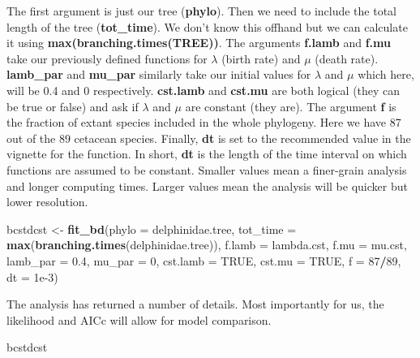 \documentclass[
]{book}
\newenvironment{Shaded}{\begin{snugshade}}{\end{snugshade}}
\newcommand{\DataTypeTok}[1]{\textcolor[rgb]{0.13,0.29,0.53}{#1}}
\newcommand{\DecValTok}[1]{\textcolor[rgb]{0.00,0.00,0.81}{#1}}
\newcommand{\FloatTok}[1]{\textcolor[rgb]{0.00,0.00,0.81}{#1}}
\newcommand{\KeywordTok}[1]{\textcolor[rgb]{0.13,0.29,0.53}{\textbf{#1}}}
\newcommand{\NormalTok}[1]{#1}
\newcommand{\OperatorTok}[1]{\textcolor[rgb]{0.81,0.36,0.00}{\textbf{#1}}}
\newcommand{\OtherTok}[1]{\textcolor[rgb]{0.56,0.35,0.01}{#1}}
\newcommand{\StringTok}[1]{\textcolor[rgb]{0.31,0.60,0.02}{#1}}
\begin{document}
The first argument is just our tree (\textbf{phylo}). Then we need to include the total length of the tree (\textbf{tot\_time}). We don't know this offhand but we can calculate it using \textbf{max(branching.times(TREE))}. The arguments \textbf{f.lamb} and \textbf{f.mu} take our previously defined functions for \(\lambda\) (birth rate) and \(\mu\) (death rate). \textbf{lamb\_par} and \textbf{mu\_par} similarly take our initial values for \(\lambda\) and \(\mu\) which here, will be 0.4 and 0 respectively. \textbf{cst.lamb} and \textbf{cst.mu} are both logical (they can be true or false) and ask if \(\lambda\) and \(\mu\) are constant (they are). The argument \textbf{f} is the fraction of extant species included in the whole phylogeny. Here we have 87 out of the 89 cetacean species. Finally, \textbf{dt} is set to the recommended value in the vignette for the function. In short, \textbf{dt} is the length of the time interval on which functions are assumed to be constant. Smaller values mean a finer-grain analysis and longer computing times. Larger values mean the analysis will be quicker but lower resolution.

\begin{Shaded}
\begin{Highlighting}[]
\NormalTok{bcstdcst \textless{}{-}}\StringTok{ }\KeywordTok{fit\_bd}\NormalTok{(}\DataTypeTok{phylo =}\NormalTok{ delphinidae.tree, }
                   \DataTypeTok{tot\_time =} \KeywordTok{max}\NormalTok{(}\KeywordTok{branching.times}\NormalTok{(delphinidae.tree)),}
                   \DataTypeTok{f.lamb =}\NormalTok{ lambda.cst, }\DataTypeTok{f.mu =}\NormalTok{ mu.cst,}
                   \DataTypeTok{lamb\_par =} \FloatTok{0.4}\NormalTok{, }\DataTypeTok{mu\_par =} \DecValTok{0}\NormalTok{,}
                   \DataTypeTok{cst.lamb =} \OtherTok{TRUE}\NormalTok{, }\DataTypeTok{cst.mu =} \OtherTok{TRUE}\NormalTok{,}
                   \DataTypeTok{f =} \DecValTok{87}\OperatorTok{/}\DecValTok{89}\NormalTok{, }\DataTypeTok{dt =} \FloatTok{1e{-}3}\NormalTok{)}
\end{Highlighting}
\end{Shaded}

The analysis has returned a number of details. Most importantly for us, the likelihood and AICc will allow for model comparison.

\begin{Shaded}
\begin{Highlighting}[]
\NormalTok{bcstdcst}
\end{Highlighting}
\end{Shaded}
\end{document}
